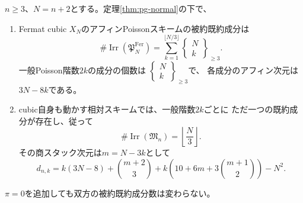 \begin{theorem}
\label{thm:pg-fermat-relative-count}
$n\ge3$、$N=n+2$とする。定理\ref{thm:pg-normal}の下で、
\begin{enumerate}
\item Fermat cubic $X_N$のアフィンPoissonスキームの被約既約成分は
\[
 \#\operatorname{Irr}(\mathfrak P_N^{\mathrm{Fer}})
 =\sum_{k=1}^{\lfloor N/3\rfloor}
  \left\{\begin{smallmatrix}N\\k\end{smallmatrix}\right\}_{\ge3}.
 \tag{F}\label{eq:pg-fermat-count}
\]
 一般Poisson階数$2k$の成分の個数は
 $\left\{\begin{smallmatrix}N\\k\end{smallmatrix}\right\}_{\ge3}$で、
 各成分のアフィン次元は$3N-8k$である。
\item cubic自身も動かす相対スキームでは、一般階数$2k$ごとに
 ただ一つの既約成分が存在し、従って
\[
 \#\operatorname{Irr}(\mathfrak M_n)=\left\lfloor\frac{N}{3}\right\rfloor.
 \tag{R}\label{eq:pg-relative-count}
\]
 その商スタック次元は$m=N-3k$として
\begin{equation}
 \label{eq:pg-relative-dim}
 d_{n,k}=k(3N-8)+\binom{m+2}{3}
 +k\left(10+6m+3\binom{m+1}{2}\right)-N^2.
\end{equation}
\end{enumerate}
$\pi=0$を追加しても双方の被約既約成分数は変わらない。
\end{theorem}

